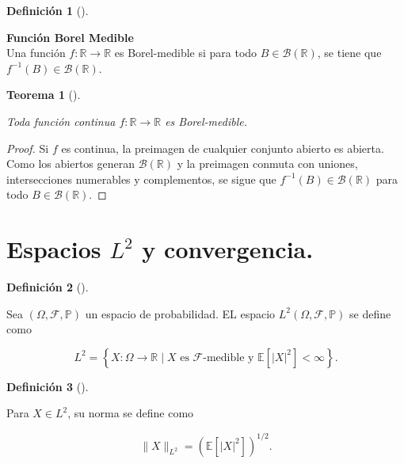 \documentclass[
  spanish,
  us-letterpaper,
]{scrreprt}
\theoremstyle{plain}
\newtheorem{theorem}{Teorema}[chapter]
\theoremstyle{plain}
\theoremstyle{plain}
\theoremstyle{definition}
\newtheorem{definition}{Definición}[chapter]
\theoremstyle{remark}
\begin{document}
\begin{definition}[]\protect\hypertarget{def-fun_borel}{}\label{def-fun_borel}

\textbf{Función Borel Medible}\\
Una función \(f: \mathbb{R} \to \mathbb{R}\) es Borel-medible si para
todo \(B \in \mathcal{B}(\mathbb{R})\), se tiene que
\(f^{-1}(B) \in \mathcal{B}(\mathbb{R})\).

\end{definition}

\begin{theorem}[]\protect\hypertarget{thm-}{}\label{thm-}

Toda función continua \(f: \mathbb{R}\to \mathbb{R}\) es Borel-medible.

\end{theorem}

\begin{proof}
Si \(f\) es continua, la preimagen de cualquier conjunto abierto es
abierta. Como los abiertos generan \(\mathcal{B}(\mathbb{R})\) y la
preimagen conmuta con uniones, intersecciones numerables y complementos,
se sigue que \(f^{-1}(B) \in \mathcal{B}(\mathbb{R})\) para todo
\(B \in \mathcal{B}(\mathbb{R})\).
\end{proof}

\section{\texorpdfstring{Espacios \(L^2\) y
convergencia.}{Espacios L\^{}2 y convergencia.}}\label{espacios-l2-y-convergencia.}

\begin{definition}[]\protect\hypertarget{def-espacio_l2}{}\label{def-espacio_l2}

Sea \((\Omega,\mathcal{F},\mathbb{P})\) un espacio de probabilidad. EL
espacio \(L^2(\Omega, \mathcal{F}, \mathbb{P})\) se define como

\[
L^2 = \left\{ X: \Omega \to \mathbb{R} \mid X \text{ es } \mathcal{F}\text{-medible y } \mathbb{E}[|X|^2] < \infty \right\}.
\]

\end{definition}

\begin{definition}[]\protect\hypertarget{def-norma_l2}{}\label{def-norma_l2}

Para \(X \in L^2\), su norma se define como

\[
\|X\|_{L^2} = \left( \mathbb{E}[|X|^2] \right)^{1/2}.
\]

\end{definition}
\end{document}
